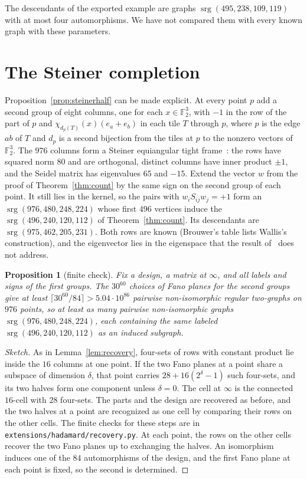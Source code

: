 \documentclass[11pt]{amsart}
\newtheorem{proposition}[theorem]{Proposition}
\theoremstyle{remark}
\newcommand{\F}{\mathbb{F}}
\DeclareMathOperator{\srg}{srg}
\begin{document}
The descendants of the exported example are graphs $\srg(495,238,109,119)$ with at most four automorphisms. We have not compared them with every known graph with these parameters.

\section{The Steiner completion}\label{sec:steiner}

Proposition~\ref{prop:steinerhalf} can be made explicit. At every point $p$ add a second group of eight columns, one for each $x\in\F_2^3$, with $-1$ in the row of the part of $p$ and $\chi_{d_p(T)}(x)(e_a+e_b)$ in each tile $T$ through $p$, where $p$ is the edge $ab$ of $T$ and $d_p$ is a second bijection from the tiles at $p$ to the nonzero vectors of $\F_2^3$. The $976$ columns form a Steiner equiangular tight frame~\cite{FMT12}: the rows have squared norm $80$ and are orthogonal, distinct columns have inner product $\pm1$, and the Seidel matrix has eigenvalues $65$ and $-15$. Extend the vector $w$ from the proof of Theorem~\ref{thm:count} by the same sign on the second group of each point. It still lies in the kernel, so the pairs with $w_iS_{ij}w_j=+1$ form an $\srg(976,480,248,224)$ whose first $496$ vertices induce the $\srg(496,240,120,112)$ of Theorem~\ref{thm:count}. Its descendants are $\srg(975,462,205,231)$. Both rows are known (Brouwer's table lists Wallis's construction), and the eigenvector lies in the eigenspace that the result of~\cite{P442} does not address.

\begin{proposition}[finite check]\label{prop:completion}
Fix a design, a matrix at $\infty$, and all labels and signs of the first groups. The $30^{60}$ choices of Fano planes for the second groups give at least $\lceil30^{60}/84\rceil>5.04\cdot10^{86}$ pairwise non-isomorphic regular two-graphs on $976$ points, so at least as many pairwise non-isomorphic graphs $\srg(976,480,248,224)$, each containing the same labeled $\srg(496,240,120,112)$ as an induced subgraph.
\end{proposition}

\begin{proof}[Sketch]
As in Lemma~\ref{lem:recovery}, four-sets of rows with constant product lie inside the $16$ columns at one point. If the two Fano planes at a point share a subspace of dimension $\delta$, that point carries $28+16(2^\delta-1)$ such four-sets, and its two halves form one component unless $\delta=0$. The cell at $\infty$ is the connected $16$-cell with $28$ four-sets. The parts and the design are recovered as before, and the two halves at a point are recognized as one cell by comparing their rows on the other cells. The finite checks for these steps are in \texttt{extensions/hadamard/recovery.py}. At each point, the rows on the other cells recover the two Fano planes up to exchanging the halves. An isomorphism induces one of the $84$ automorphisms of the design, and the first Fano plane at each point is fixed, so the second is determined.
\end{proof}
\end{document}
